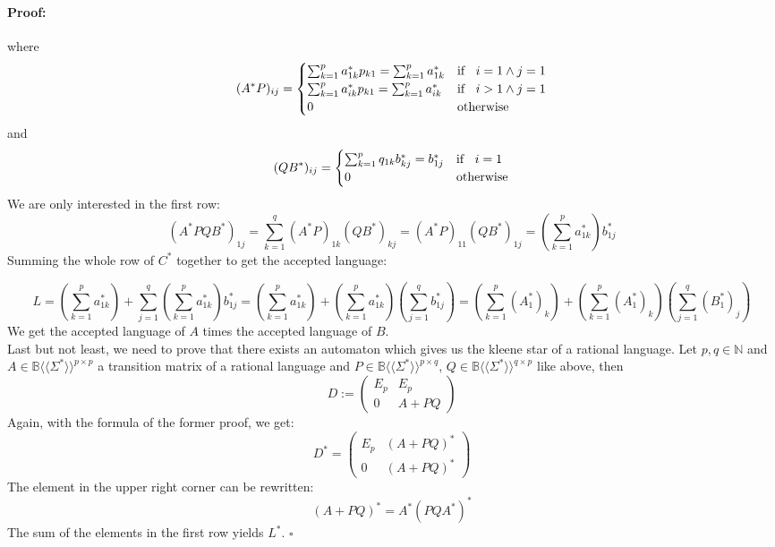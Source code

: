 \documentclass[12pt,letterpaper]{article}
\newenvironment{proof}{\paragraph{Proof:}}{\hfill$\square$}
\newcommand{\fps}[1] {
\mathbb{#1}\langle \langle \Sigma^* \rangle \rangle
}
\begin{document}
\begin{proof}
\[  \]
  where
  \[
    (A^*P)_{ij} = 
    \begin{cases}
      \sum_{k=1}^{p} a^*_{1k}p_{k1} =  \sum_{k=1}^{p} a^*_{1k} 
        & \text{if } \hspace{0.2cm} i = 1 \land j = 1\\
      \sum_{k=1}^{p} a^*_{ik}p_{k1} =  \sum_{k=1}^{p} a^*_{ik} 
        & \text{if } \hspace{0.2cm} i > 1\land j = 1\\
      0 & \text{otherwise}
    \end{cases}
  \]
  and 
  \[
    (QB^*)_{ij} = 
    \begin{cases}
      \sum_{k=1}^{p} q_{1k}b^*_{kj} = b^*_{1j}
        & \text{if } \hspace{0.2cm} i = 1\\
      0  & \text{otherwise}
    \end{cases}
  \]
  We are only interested in the first row:
  \[
    (A^*PQB^*)_{1j} = \sum_{k=1}^{q} (A^*P)_{1k}(QB^*)_{kj} 
      = (A^*P)_{11}(QB^*)_{1j}
      = (\sum_{k=1}^{p} a^*_{1k})b^*_{1j}
  \]
  Summing the whole row of $C^*$ together to get the accepted language: 

  \[
    L = (\sum_{k=1}^{p} a^*_{1k}) + \sum_{j=1}^q (\sum_{k=1}^{p} a^*_{1k})b^*_{1j}
      = (\sum_{k=1}^{p} a^*_{1k}) + (\sum_{k=1}^{p} a^*_{1k}) (\sum_{j=1}^q b^*_{1j})
      = (\sum_{k=1}^{p} (A^*_1)_k) + (\sum_{k=1}^{p} (A^*_1)_k) (\sum_{j=1}^q (B^*_1)_j)
  \]
  We get the accepted language of $A$ times the accepted language of $B$.\\
  Last but not least, we need to prove that there exists an automaton which
  gives us the kleene star of a rational language. Let 
  $p,q\in \mathbb{N}$ and $A \in \fps{B}^{p \times p}$
  a transition matrix of a rational language 
  and  $P \in \fps{B}^{p \times q}$, $Q \in \fps{B}^{q \times p}$
  like above, then
  \[
    D := 
    \begin{pmatrix}
      E_p &  E_p\\
      0        & A + PQ
    \end{pmatrix}
  \]
  Again, with the formula of the former proof, we get:
  \[
    D^* = 
    \begin{pmatrix}
      E_p &  (A + PQ)^*\\
      0   &  (A + PQ)^*
    \end{pmatrix}
  \]
  The element in the upper right corner can be rewritten:
  \[
    (A+PQ)^* = A^*(PQA^*)^*
  \]
  The sum of the elements in the first row yields $L^*$.
\end{proof}
\end{document}
